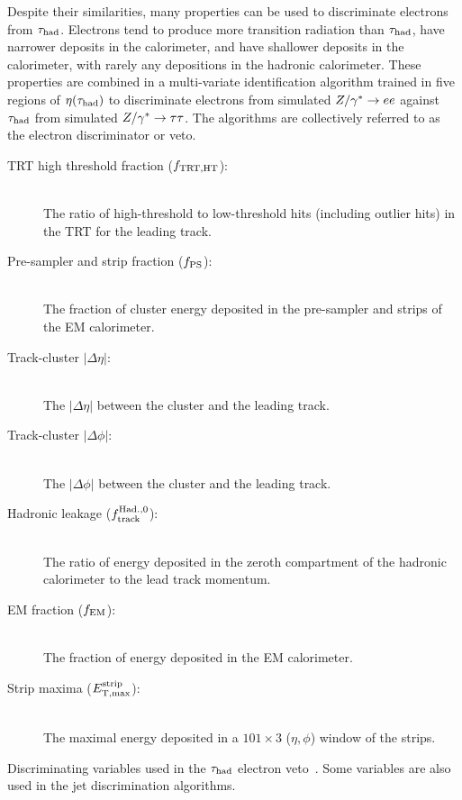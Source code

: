Despite their similarities, many properties can be used to discriminate electrons from $\tau_\text{had}$. Electrons tend to produce more transition radiation than $\tau_\text{had}$, have narrower deposits in the calorimeter, and have shallower deposits in the calorimeter, with rarely any depositions in the hadronic calorimeter. These properties are combined in a multi-variate identification algorithm trained in five regions of $\eta(\tauh)$ to discriminate electrons from simulated $Z/\gamma^\ast \rightarrow ee$ against $\tau_\text{had}$ from simulated $Z/\gamma^\ast \rightarrow \tau\tau$. The algorithms are collectively referred to as the electron discriminator or veto. 
%
\begin{description}
    \item[TRT high threshold fraction ($f_\mathrm{TRT,HT}$):] \hfill \\
      The ratio of high-threshold to low-threshold hits (including outlier hits) in the TRT for the leading track.
    \item[Pre-sampler and strip fraction ($f_\mathrm{PS}$):] \hfill \\
      The fraction of cluster energy deposited in the pre-sampler and strips of the EM calorimeter.
    \item[Track-cluster $|\Delta\eta|$:] \hfill \\
      The $|\Delta\eta|$ between the cluster and the leading track.
    \item[Track-cluster $|\Delta\phi|$:] \hfill \\
      The $|\Delta\phi|$ between the cluster and the leading track.
    \item[Hadronic leakage ($f^\mathrm{Had.,0}_{\mathrm{track}}$):] \hfill \\
      The ratio of energy deposited in the zeroth compartment of the hadronic calorimeter to the lead track momentum.
    \item[EM fraction ($f_\mathrm{EM}$):] \hfill \\
      The fraction of energy deposited in the EM calorimeter.
    \item[Strip maxima ($E_\mathrm{T,max}^\mathrm{strip}$):] \hfill \\
      The maximal energy deposited in a $101 \!\times\! 3$ ($\eta, \phi$) window of the strips.
\end{description}
%
\begin{table}[bp] 
  \centering
  \renewcommand{\arraystretch}{1.4}
  \caption{Discriminating variables used in the $\tau_\text{had}$ electron veto~\cite{PERF-2013-06,ATLAS-CONF-2013-064,ATLAS-CONF-2012-142}. Some variables are also used in the jet discrimination algorithms.}
  
  \label{tab:taus-evetovars}
\end{table}

